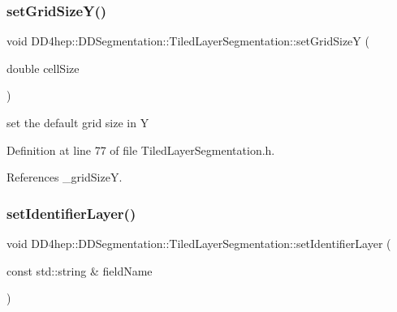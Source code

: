 \hypertarget{class_d_d4hep_1_1_d_d_segmentation_1_1_tiled_layer_segmentation_a1d3f9e083551c3a67500d7da77d33684}{}\label{class_d_d4hep_1_1_d_d_segmentation_1_1_tiled_layer_segmentation_a1d3f9e083551c3a67500d7da77d33684} 
\subsubsection{\texorpdfstring{set\+Grid\+Size\+Y()}{setGridSizeY()}}
{\footnotesize\ttfamily void D\+D4hep\+::\+D\+D\+Segmentation\+::\+Tiled\+Layer\+Segmentation\+::set\+Grid\+SizeY (\begin{DoxyParamCaption}\item[{double}]{cell\+Size }\end{DoxyParamCaption})\hspace{0.3cm}{\ttfamily [inline]}}



set the default grid size in Y 



Definition at line 77 of file Tiled\+Layer\+Segmentation.\+h.



References \+\_\+grid\+SizeY.

\hypertarget{class_d_d4hep_1_1_d_d_segmentation_1_1_tiled_layer_segmentation_a3fed8d866ede1df684ec06344725b72c}{}\label{class_d_d4hep_1_1_d_d_segmentation_1_1_tiled_layer_segmentation_a3fed8d866ede1df684ec06344725b72c} 
\subsubsection{\texorpdfstring{set\+Identifier\+Layer()}{setIdentifierLayer()}}
{\footnotesize\ttfamily void D\+D4hep\+::\+D\+D\+Segmentation\+::\+Tiled\+Layer\+Segmentation\+::set\+Identifier\+Layer (\begin{DoxyParamCaption}\item[{const std\+::string \&}]{field\+Name }\end{DoxyParamCaption})\hspace{0.3cm}{\ttfamily [inline]}}



